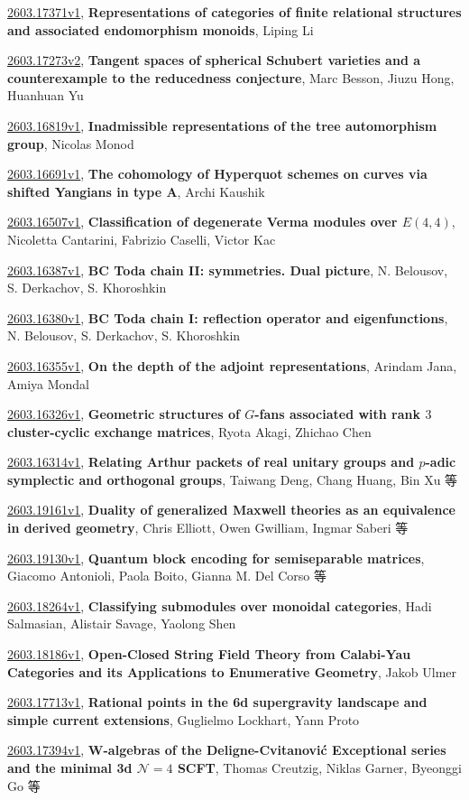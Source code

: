 \documentclass[9pt, a4paper]{article}
\theoremstyle{plain}
\theoremstyle{definition}
\theoremstyle{remark}
\newcommand{\arxiv}[3]{\href{https://arxiv.org/abs/#1}{#1}, \textbf{\textcolor{arxivblue}{#2}}, #3}
\begin{document}
\arxiv{2603.17371v1}{Representations of categories of finite relational structures and associated endomorphism monoids}{Liping Li}

\arxiv{2603.17273v2}{Tangent spaces of spherical Schubert varieties and a counterexample to the reducedness conjecture}{Marc Besson, Jiuzu Hong, Huanhuan Yu}

\arxiv{2603.16819v1}{Inadmissible representations of the tree automorphism group}{Nicolas Monod}

\arxiv{2603.16691v1}{The cohomology of Hyperquot schemes on curves via shifted Yangians in type A}{Archi Kaushik}

\arxiv{2603.16507v1}{Classification of degenerate Verma modules over $E(4,4)$}{Nicoletta Cantarini, Fabrizio Caselli, Victor Kac}

\arxiv{2603.16387v1}{BC Toda chain II: symmetries. Dual picture}{N. Belousov, S. Derkachov, S. Khoroshkin}

\arxiv{2603.16380v1}{BC Toda chain I: reflection operator and eigenfunctions}{N. Belousov, S. Derkachov, S. Khoroshkin}

\arxiv{2603.16355v1}{On the depth of the adjoint representations}{Arindam Jana, Amiya Mondal}

\arxiv{2603.16326v1}{Geometric structures of $G$-fans associated with rank $3$ cluster-cyclic exchange matrices}{Ryota Akagi, Zhichao Chen}

\arxiv{2603.16314v1}{Relating Arthur packets of real unitary groups and $p$-adic symplectic and orthogonal groups}{Taiwang Deng, Chang Huang, Bin Xu 等}

\arxiv{2603.19161v1}{Duality of generalized Maxwell theories as an equivalence in derived geometry}{Chris Elliott, Owen Gwilliam, Ingmar Saberi 等}

\arxiv{2603.19130v1}{Quantum block encoding for semiseparable matrices}{Giacomo Antonioli, Paola Boito, Gianna M. Del Corso 等}

\arxiv{2603.18264v1}{Classifying submodules over monoidal categories}{Hadi Salmasian, Alistair Savage, Yaolong Shen}

\arxiv{2603.18186v1}{Open-Closed String Field Theory from Calabi-Yau Categories and its Applications to Enumerative Geometry}{Jakob Ulmer}

\arxiv{2603.17713v1}{Rational points in the 6d supergravity landscape and simple current extensions}{Guglielmo Lockhart, Yann Proto}

\arxiv{2603.17394v1}{W-algebras of the Deligne-Cvitanović Exceptional series and the minimal 3d ${\mathcal N}=4$ SCFT}{Thomas Creutzig, Niklas Garner, Byeonggi Go 等}
\end{document}
